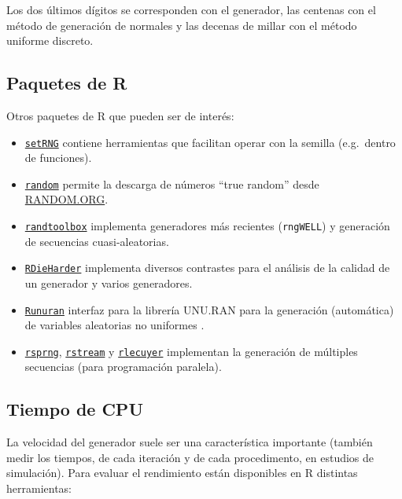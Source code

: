 \documentclass[
  10pt,
]{book}
\theoremstyle{break}
\theoremstyle{nonumberplain}
\begin{document}
Los dos últimos dígitos se corresponden con el generador, las centenas con el método de generación de normales y las decenas de millar con el método uniforme discreto.

\hypertarget{paquetes-de-r}{%
\subsection{Paquetes de R}\label{paquetes-de-r}}

Otros paquetes de R que pueden ser de interés:

\begin{itemize}
\item
  \href{https://CRAN.R-project.org/package=setRNG}{\texttt{setRNG}} contiene herramientas que facilitan operar con la semilla
  (e.g.~dentro de funciones).
\item
  \href{https://CRAN.R-project.org/package=random}{\texttt{random}} permite la descarga de números ``true random'' desde
  \href{https://www.random.org}{RANDOM.ORG}.
\item
  \href{https://CRAN.R-project.org/package=randtoolbox}{\texttt{randtoolbox}} implementa generadores más recientes (\texttt{rngWELL}) y
  generación de secuencias cuasi-aleatorias.
\item
  \href{https://CRAN.R-project.org/package=RDieHarder}{\texttt{RDieHarder}} implementa diversos contrastes para el análisis de la
  calidad de un generador y varios generadores.
\item
  \href{https://CRAN.R-project.org/package=Runuran}{\texttt{Runuran}} interfaz para la librería UNU.RAN para la generación
  (automática) de variables aleatorias no uniformes \citep[ver][]{hormann2004}.
\item
  \href{https://CRAN.R-project.org/package=rsprng}{\texttt{rsprng}}, \href{https://CRAN.R-project.org/package=rstream}{\texttt{rstream}} y \href{https://CRAN.R-project.org/package=rlecuyer}{\texttt{rlecuyer}} implementan
  la generación de múltiples secuencias (para programación paralela).
\end{itemize}

\hypertarget{tiempo-de-cpu}{%
\subsection{Tiempo de CPU}\label{tiempo-de-cpu}}

La velocidad del generador suele ser una característica importante (también medir los tiempos, de cada iteración y de cada procedimento, en estudios de simulación).
Para evaluar el rendimiento están disponibles en R distintas herramientas:
\end{document}
